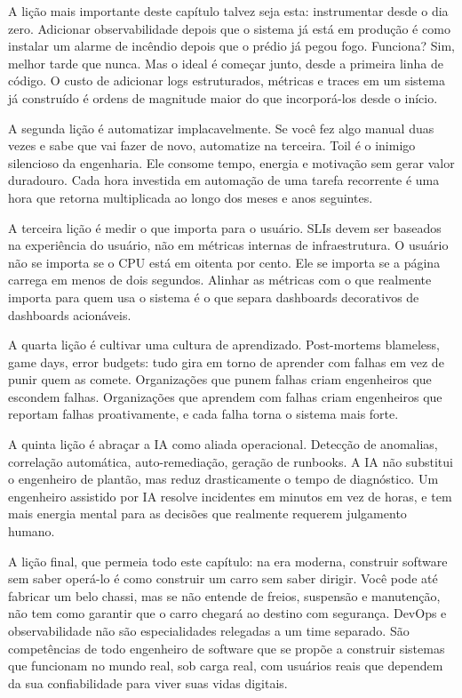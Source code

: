 A lição mais importante deste capítulo talvez seja esta: instrumentar desde o
dia zero. Adicionar observabilidade depois que o sistema já está em produção é
como instalar um alarme de incêndio depois que o prédio já pegou fogo. Funciona?
Sim, melhor tarde que nunca. Mas o ideal é começar junto, desde a primeira linha
de código. O custo de adicionar logs estruturados, métricas e traces em um sistema
já construído é ordens de magnitude maior do que incorporá-los desde o início.

A segunda lição é automatizar implacavelmente. Se você fez algo manual duas vezes
e sabe que vai fazer de novo, automatize na terceira. Toil é o inimigo silencioso
da engenharia. Ele consome tempo, energia e motivação sem gerar valor
duradouro. Cada hora investida em automação de uma tarefa recorrente é uma hora
que retorna multiplicada ao longo dos meses e anos seguintes.

A terceira lição é medir o que importa para o usuário. SLIs devem ser baseados
na experiência do usuário, não em métricas internas de infraestrutura. O usuário
não se importa se o CPU está em oitenta por cento. Ele se importa se a página
carrega em menos de dois segundos. Alinhar as métricas com o que realmente importa
para quem usa o sistema é o que separa dashboards decorativos de dashboards
acionáveis.

A quarta lição é cultivar uma cultura de aprendizado. Post-mortems blameless,
game days, error budgets: tudo gira em torno de aprender com falhas em vez
de punir quem as comete. Organizações que punem falhas criam engenheiros que
escondem falhas. Organizações que aprendem com falhas criam engenheiros que
reportam falhas proativamente, e cada falha torna o sistema mais forte.

A quinta lição é abraçar a IA como aliada operacional. Detecção de anomalias,
correlação automática, auto-remediação, geração de runbooks. A IA não substitui
o engenheiro de plantão, mas reduz drasticamente o tempo de diagnóstico. Um
engenheiro assistido por IA resolve incidentes em minutos em vez de horas, e
tem mais energia mental para as decisões que realmente requerem julgamento humano.

A lição final, que permeia todo este capítulo: na era moderna, construir software
sem saber operá-lo é como construir um carro sem saber dirigir. Você pode até
fabricar um belo chassi, mas se não entende de freios, suspensão e manutenção,
não tem como garantir que o carro chegará ao destino com segurança. DevOps e
observabilidade não são especialidades relegadas a um time separado. São
competências de todo engenheiro de software que se propõe a
construir sistemas que funcionam no mundo real, sob carga real, com usuários
reais que dependem da sua confiabilidade para viver suas vidas digitais.

